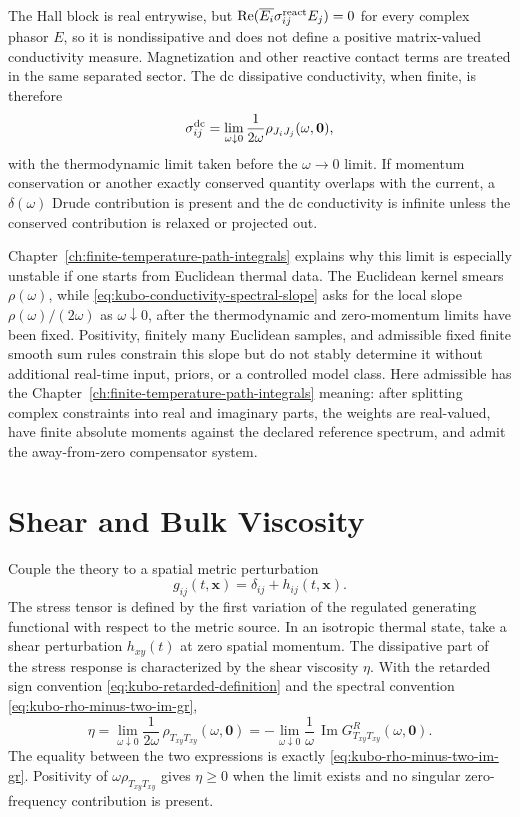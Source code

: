 The Hall block is real entrywise, but
\(\operatorname{Re}(\overline{E_i}\sigma^{\rm react}_{ij}E_j)=0\) for every
complex phasor \(E\), so it is nondissipative and does not define a positive
matrix-valued conductivity measure.  Magnetization and other reactive contact
terms are treated in the same separated sector.  The dc dissipative
conductivity, when finite, is therefore
\[
  \sigma_{ij}^{\rm dc}
  =
  \lim_{\omega\downarrow0}
  \frac{1}{2\omega}\rho_{J_iJ_j}(\omega,\mathbf0),
\]
with the thermodynamic limit taken before the \(\omega\to0\) limit.  If
momentum conservation or another exactly conserved quantity overlaps with
the current, a \(\delta(\omega)\) Drude contribution is present and the dc
conductivity is infinite unless the conserved contribution is relaxed or
projected out.

Chapter~\ref{ch:finite-temperature-path-integrals} explains why this
limit is especially unstable if one starts from Euclidean thermal data.  The
Euclidean kernel smears \(\rho(\omega)\), while
\eqref{eq:kubo-conductivity-spectral-slope} asks for the local slope
\(\rho(\omega)/(2\omega)\) as \(\omega\downarrow0\), after the thermodynamic
and zero-momentum limits have been fixed.  Positivity, finitely many Euclidean
samples, and admissible fixed finite smooth sum rules constrain this slope but
do not stably determine it without additional real-time input, priors, or a
controlled model class.  Here admissible has the
Chapter~\ref{ch:finite-temperature-path-integrals} meaning: after splitting
complex constraints into real and imaginary parts, the weights are real-valued,
have finite absolute moments against the declared reference spectrum, and admit
the away-from-zero compensator system.

\section{Shear and Bulk Viscosity}

Couple the theory to a spatial metric perturbation
\[
  g_{ij}(t,\mathbf x)=\delta_{ij}+h_{ij}(t,\mathbf x).
\]
The stress tensor is defined by the first variation of the regulated
generating functional with respect to the metric source.  In an isotropic
thermal state, take a shear perturbation \(h_{xy}(t)\) at zero spatial
momentum.  The dissipative part of the stress response is characterized by
the shear viscosity \(\eta\).  With the retarded sign convention
\eqref{eq:kubo-retarded-definition} and the spectral convention
\eqref{eq:kubo-rho-minus-two-im-gr},
\begin{equation}
  \eta
  =
  \lim_{\omega\downarrow0}
  \frac{1}{2\omega}\,
  \rho_{T_{xy}T_{xy}}(\omega,\mathbf0)
  =
  -\lim_{\omega\downarrow0}
  \frac{1}{\omega}\,
  \operatorname{Im}G^R_{T_{xy}T_{xy}}(\omega,\mathbf0).
  \label{eq:kubo-shear-viscosity-sign-correct}
\end{equation}
The equality between the two expressions is exactly
\eqref{eq:kubo-rho-minus-two-im-gr}.  Positivity of
\(\omega\rho_{T_{xy}T_{xy}}\) gives \(\eta\ge0\) when the limit exists and
no singular zero-frequency contribution is present.

